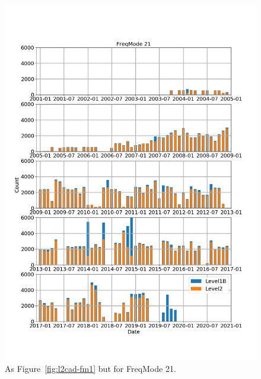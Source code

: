 \begin{figure}[t]
\centering
\includegraphics[width=1.0\textwidth]{l2cad-fm21.png}
\caption{As Figure~\ref{fig:l2cad-fm1} but for FreqMode 21.}
\label{fig:l2cad-fm21}
\end{figure}

